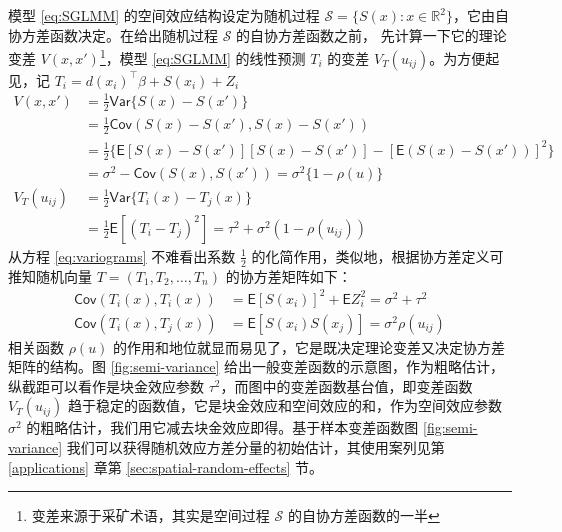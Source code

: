 \documentclass[12pt,a4paper,UTF8,twoside]{book}
\theoremstyle{definition}
\theoremstyle{definition}
\theoremstyle{definition}
\theoremstyle{remark}
\begin{document}
模型 \eqref{eq:SGLMM} 的空间效应结构设定为随机过程
\(\mathcal{S} = \{S(x): x \in \mathbb{R}^2\}\)，它由自协方差函数决定。在给出随机过程
\(\mathcal{S}\) 的自协方差函数之前， 先计算一下它的理论变差
\(V(x,x')\)\footnote{变差来源于采矿术语，其实是空间过程 \(\mathcal{S}\)
  的自协方差函数的一半}，模型 \eqref{eq:SGLMM} 的线性预测 \(T_{i}\) 的变差
\(V_{T}(u_{ij})\)。为方便起见，记
\(T_{i} = d(x_i)^{\top}\beta + S(x_i) + Z_i\) \begin{equation}
\begin{aligned}
V(x,x') 
      &= \frac{1}{2}\mathsf{Var}\{S(x)-S(x')\}\\
      &= \frac{1}{2}\mathsf{Cov}(S(x)-S(x'),S(x)-S(x'))\\
      &= \frac{1}{2}\{\mathsf{E}[S(x)-S(x')][S(x)-S(x')]-[\mathsf{E}(S(x)-S(x'))]^2\}\\
      &= \sigma^2-\mathsf{Cov}(S(x),S(x'))=\sigma^2\{1-\rho(u)\}\\
V_{T}(u_{ij})
      &= \frac{1}{2}\mathsf{Var}\{T_{i}(x)-T_{j}(x)\} \\
      &= \frac{1}{2}\mathsf{E}[(T_{i}-T_{j})^2]=\tau^2+\sigma^2(1-\rho(u_{ij})) 
\end{aligned} \label{eq:variograms}
\end{equation} \noindent 从方程 \eqref{eq:variograms} 不难看出系数
\(\frac{1}{2}\) 的化简作用，类似地，根据协方差定义可推知随机向量
\(T = (T_1,T_2,\ldots,T_n)\) 的协方差矩阵如下： \begin{equation}
\begin{aligned}
\mathsf{Cov}(T_{i}(x),T_{i}(x)) &= \mathsf{E}[S(x_i)]^2 + \mathsf{E}Z_{i}^{2}= \sigma^2+\tau^2 \\
\mathsf{Cov}(T_{i}(x),T_{j}(x)) &= \mathsf{E}[S(x_i)S(x_j)]  = \sigma^2\rho(u_{ij})
\end{aligned}
\end{equation} \noindent 相关函数 \(\rho(u)\)
的作用和地位就显而易见了，它是既决定理论变差又决定协方差矩阵的结构。图
\ref{fig:semi-variance}
给出一般变差函数的示意图，作为粗略估计，纵截距可以看作是块金效应参数
\(\tau^2\)，而图中的变差函数基台值，即变差函数 \(V_{T}(u_{ij})\)
趋于稳定的函数值，它是块金效应和空间效应的和，作为空间效应参数
\(\sigma^2\) 的粗略估计，我们用它减去块金效应即得。基于样本变差函数图
\ref{fig:semi-variance}
我们可以获得随机效应方差分量的初始估计，其使用案列见第
\ref{applications} 章第 \ref{sec:spatial-random-effects} 节。
\end{document}
